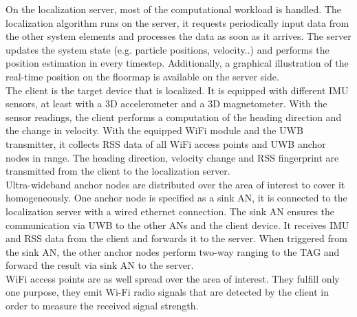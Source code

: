 \noindent\hspace*{5mm}%
On the localization server, most of the computational workload is handled. The localization algorithm runs on the server, it requests periodically input data from the other system elements and processes the data as soon as it arrives. The server updates the system state (e.g. particle positions, velocity..) and performs the position estimation in every timestep. Additionally, a graphical illustration of the real-time position on the floormap is available on the server side. \\
\noindent\hspace*{5mm}%
The client is the target device that is localized. It is equipped with different IMU sensors, at least with a 3D accelerometer and a 3D magnetometer. With the sensor readings, the client performs a computation of the heading direction and the change in velocity. With the equipped WiFi module and the UWB transmitter, it collects RSS data of all WiFi access points and UWB anchor nodes in range. The heading direction, velocity change and RSS fingerprint are transmitted from the client to the localization server.\\
\noindent\hspace*{5mm}%
Ultra-wideband anchor nodes are distributed over the area of interest to cover it homogeneously. One anchor node is specified as a sink AN, it is connected to the localization server with a wired ethernet connection. The sink AN ensures the communication via UWB to the other ANs and the client device. It receives IMU and RSS data from the client and forwards it to the server. When triggered from the sink AN, the other anchor nodes perform two-way ranging to the TAG and forward the result via sink AN to the server.\\
\noindent\hspace*{5mm}%
WiFi access points are as well spread over the area of interest. They fulfill only one purpose, they emit Wi-Fi radio signals that are detected by the client in order to measure the received signal strength. 


